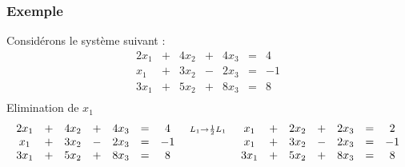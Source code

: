 \documentclass[12pt,a4paper]{article}
\begin{document}
\subsubsection*{\textcolor{expl!60!black}{Exemple}}
Considérons le système suivant :
\[
\begin{array}{ccccccc}
2x_1&+&4x_2&+&4x_3&=&4\\
x_1&+&3x_2&-&2x_3&=&-1\\
3x_1&+&5x_2&+&8x_3&=&8\\
\end{array}
\]
Elimination de \(x_1\)
\[
\begin{array}{ccccccc}
2x_1&+&4x_2&+&4x_3&=&4\\
x_1&+&3x_2&-&2x_3&=&-1\\
3x_1&+&5x_2&+&8x_3&=&8\\
\end{array}
~
\begin{array}{c}
 \mathsmaller{L_1 \rightarrow \frac{1}{2}L_1} \\
~
\\
~
\end{array}
~
\begin{array}{ccccccc}
x_1&+&2x_2&+&2x_3&=&2\\
x_1&+&3x_2&-&2x_3&=&-1\\
3x_1&+&5x_2&+&8x_3&=&8\\
\end{array}
\]
\end{document}
